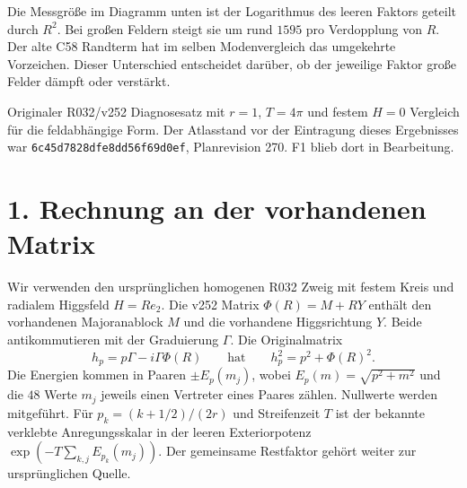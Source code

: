 \documentclass[11pt,a4paper]{article}
\newcommand{\src}[1]{\texttt{#1}}
\begin{document}
Die Messgröße im Diagramm unten ist der Logarithmus des leeren Faktors geteilt durch \(R^2\). Bei großen Feldern steigt sie um rund \(1595\) pro Verdopplung von \(R\). Der alte C58 Randterm hat im selben Modenvergleich das umgekehrte Vorzeichen. Dieser Unterschied entscheidet darüber, ob der jeweilige Faktor große Felder dämpft oder verstärkt.

\begin{center}
\end{center}
\small
Originaler R032/v252 Diagnosesatz mit \(r=1\), \(T=4\pi\) und festem \(H=0\) Vergleich für die feldabhängige Form. Der Atlasstand vor der Eintragung dieses Ergebnisses war \src{6c45d7828dfe8dd56f69d0ef}, Planrevision 270. F1 blieb dort in Bearbeitung.

\clearpage
\section*{1. Rechnung an der vorhandenen Matrix}

Wir verwenden den ursprünglichen homogenen R032 Zweig mit festem Kreis und radialem Higgsfeld \(H=R e_2\). Die v252 Matrix \(\Phi(R)=M+R Y\) enthält den vorhandenen Majoranablock \(M\) und die vorhandene Higgsrichtung \(Y\). Beide antikommutieren mit der Graduierung \(\Gamma\). Die Originalmatrix
\[
 h_p=p\Gamma-i\Gamma\Phi(R)
 \qquad\text{hat}\qquad h_p^2=p^2+\Phi(R)^2 .
\]
Die Energien kommen in Paaren \(\pm E_p(m_j)\), wobei \(E_p(m)=\sqrt{p^2+m^2}\) und die \(48\) Werte \(m_j\) jeweils einen Vertreter eines Paares zählen. Nullwerte werden mitgeführt. Für \(p_k=(k+1/2)/(2r)\) und Streifenzeit \(T\) ist der bekannte verklebte Anregungsskalar in der leeren Exteriorpotenz \(\exp(-T\sum_{k,j}E_{p_k}(m_j))\). Der gemeinsame Restfaktor gehört weiter zur ursprünglichen Quelle.
\end{document}
